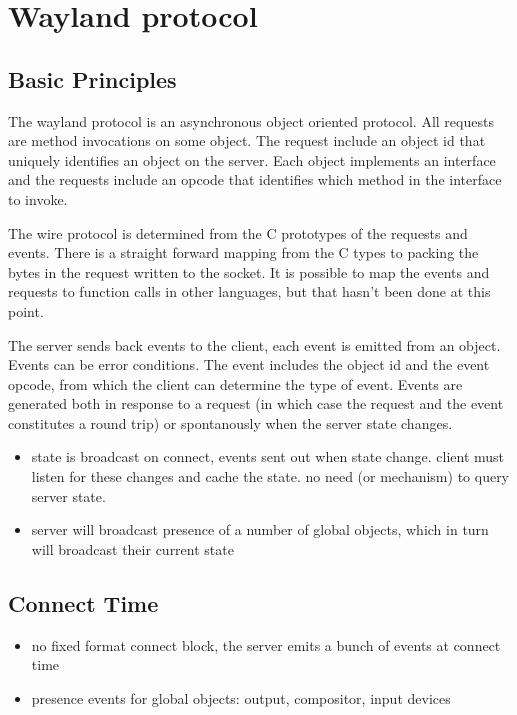 \documentclass{article}
\begin{document}
\section{Wayland protocol}

\subsection{Basic Principles}

The wayland protocol is an asynchronous object oriented protocol.  All
requests are method invocations on some object.  The request include
an object id that uniquely identifies an object on the server.  Each
object implements an interface and the requests include an opcode that
identifies which method in the interface to invoke.

The wire protocol is determined from the C prototypes of the requests
and events.  There is a straight forward mapping from the C types to
packing the bytes in the request written to the socket.  It is
possible to map the events and requests to function calls in other
languages, but that hasn't been done at this point.

The server sends back events to the client, each event is emitted from
an object.  Events can be error conditions.  The event includes the
object id and the event opcode, from which the client can determine
the type of event.  Events are generated both in response to a request
(in which case the request and the event constitutes a round trip) or
spontanously when the server state changes.

\begin{itemize}
\item state is broadcast on connect, events sent out when state
  change.  client must listen for these changes and cache the state.
  no need (or mechanism) to query server state.

\item server will broadcast presence of a number of global objects,
  which in turn will broadcast their current state
\end{itemize}

\subsection{Connect Time}

\begin{itemize}
\item no fixed format connect block, the server emits a bunch of
  events at connect time
\item presence events for global objects: output, compositor, input
  devices
\end{itemize}
\end{document}
